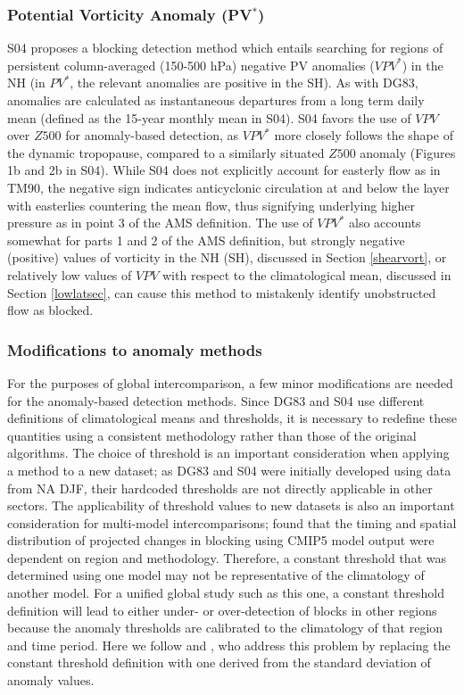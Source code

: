\documentclass[smallextended]{svjour3}       %
\numberwithin{equation}{section}
\begin{document}
\subsubsection{Potential Vorticity Anomaly (PV$^\ast$)}\label{pvanomdesc}

S04 proposes a blocking detection method which entails searching for regions of persistent column-averaged (150-500 hPa) negative PV anomalies ($VPV^*$) in the NH (in $PV^*$, the relevant anomalies are positive in the SH). As with DG83, anomalies are calculated as instantaneous departures from a long term daily mean (defined as the 15-year monthly mean in S04). S04 favors the use of $VPV$ over $Z500$ for anomaly-based detection, as $VPV^*$ more closely follows the shape of the dynamic tropopause, compared to a similarly situated $Z500$ anomaly (Figures 1b and 2b in S04). While S04 does not explicitly account for easterly flow as in TM90, the negative sign indicates anticyclonic circulation at and below the layer with easterlies countering the mean flow, thus signifying underlying higher pressure as in point 3 of the AMS definition. The use of $VPV^*$ also accounts somewhat for parts 1 and 2 of the AMS definition, but strongly negative (positive) values of vorticity in the NH (SH), discussed in Section \ref{shearvort}, or relatively low values of $VPV$ with respect to the climatological mean, discussed in Section \ref{lowlatsec}, can cause this method to mistakenly identify unobstructed flow as blocked.

\subsubsection{Modifications to anomaly methods}\label{modanom}

For the purposes of global intercomparison, a few minor modifications are needed for the anomaly-based detection methods. Since DG83 and S04 use different definitions of climatological means and thresholds, it is necessary to redefine these quantities using a consistent methodology rather than those of the original algorithms. The choice of threshold is an important consideration when applying a method to a new dataset; as DG83 and S04 were initially developed using data from NA DJF, their hardcoded thresholds are not directly applicable in other sectors. The applicability of threshold values to new datasets is also an important consideration for multi-model intercomparisons;  \cite{woollings_blocking_2018} found that the timing and spatial distribution of projected changes in blocking using CMIP5 model output were dependent on region and methodology. Therefore, a constant threshold that was determined using one model may not be representative of the climatology of another model. For a unified global study such as this one, a constant threshold definition will lead to either under- or over-detection of blocks in other regions because the anomaly thresholds are calibrated to the climatology of that region and time period. Here we follow \cite{barriopedro_application_2010} and \cite{dunn-sigouin_evaluation_2012}, who address this problem by replacing the constant threshold definition with one derived from the standard deviation of anomaly values. 
\end{document}

